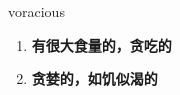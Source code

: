 
\begin{frame}
{\huge voracious}
\begin{center}
\begin{enumerate}\Large
  \item \textbf{有很大食量的，贪吃的}
  \item \textbf{贪婪的，如饥似渴的}
\end{enumerate}
\end{center}
\end{frame}
